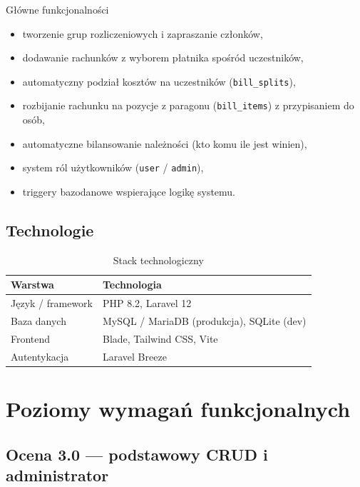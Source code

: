 \documentclass[12pt,a4paper]{report}
\begin{document}
\begin{infobox}{G\l\'owne funkcjonalno\'sci}
\begin{itemize}[leftmargin=*]
    \item tworzenie grup rozliczeniowych i zapraszanie cz\l{}onk\'ow,
    \item dodawanie rachunk\'ow z wyborem p\l{}atnika spo\'sr\'od uczestnik\'ow,
    \item automatyczny podzia\l{} koszt\'ow na uczestnik\'ow (\texttt{bill\_splits}),
    \item rozbijanie rachunku na pozycje z paragonu (\texttt{bill\_items}) z przypisaniem do os\'ob,
    \item automatyczne bilansowanie nale\.zno\'sci (kto komu ile jest winien),
    \item system r\'ol u\.zytkownik\'ow (\texttt{user} / \texttt{admin}),
    \item triggery bazodanowe wspieraj\k{a}ce logik\k{e} systemu.
\end{itemize}
\end{infobox}

\section{Technologie}

\begin{table}[H]
\centering
\caption{Stack technologiczny}
\begin{tabular}{@{}ll@{}}
\toprule
\textbf{Warstwa} & \textbf{Technologia} \\
\midrule
J\k{e}zyk / framework & PHP 8.2, Laravel 12 \\
Baza danych & MySQL / MariaDB (produkcja), SQLite (dev) \\
Frontend & Blade, Tailwind CSS, Vite \\
Autentykacja & Laravel Breeze \\
\bottomrule
\end{tabular}
\end{table}

\chapter{Poziomy wymaga\'n funkcjonalnych}

\section{Ocena 3.0 --- podstawowy CRUD i administrator}
\end{document}
